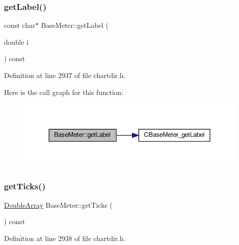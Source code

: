 \subsubsection{\texorpdfstring{get\+Label()}{getLabel()}}
{\footnotesize\ttfamily const char$\ast$ Base\+Meter\+::get\+Label (\begin{DoxyParamCaption}\item[{double}]{i }\end{DoxyParamCaption}) const\hspace{0.3cm}{\ttfamily [inline]}}



Definition at line 2937 of file chartdir.\+h.

Here is the call graph for this function\+:
\nopagebreak
\begin{figure}[H]
\begin{center}
\leavevmode
\includegraphics[width=336pt]{class_base_meter_a2cbaf32dcf5bbec04d4e1ec52091692a_cgraph}
\end{center}
\end{figure}
\mbox{\label{class_base_meter_aaab196f6d5ca6712f2486cb07277269c}} 
\subsubsection{\texorpdfstring{get\+Ticks()}{getTicks()}}
{\footnotesize\ttfamily \hyperlink{class_double_array}{Double\+Array} Base\+Meter\+::get\+Ticks (\begin{DoxyParamCaption}{ }\end{DoxyParamCaption}) const\hspace{0.3cm}{\ttfamily [inline]}}



Definition at line 2938 of file chartdir.\+h.

